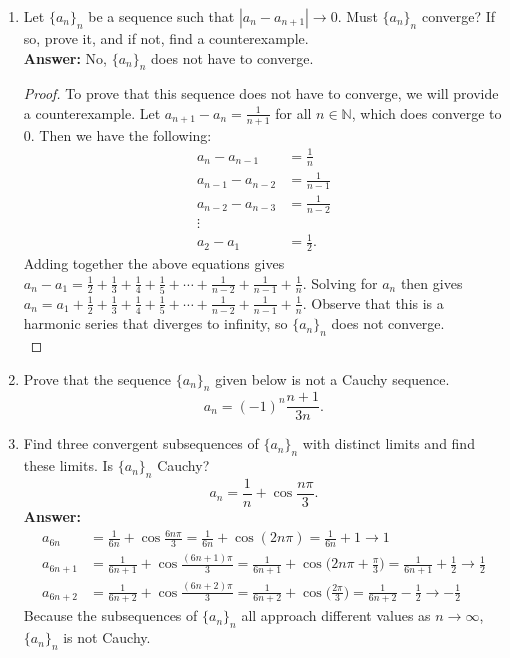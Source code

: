 \documentclass{article}
\begin{document}
\begin{enumerate}
        \item Let $\{a_n\}_n$ be a sequence such that $|a_n - a_{n+1}| \to 0$. Must $\{a_n\}_n$ converge? If so, prove it, and if not, find a counterexample.\\
        \textbf{Answer: }No, $\{a_n\}_n$ does not have to converge.
            \begin{proof}
                To prove that this sequence does not have to converge, we will provide a counterexample. Let $a_{n+1}-a_n = \frac{1}{n+1}$ for all $n \in \mathbb{N}$, which does converge to $0$. Then we have the following:
                    \begin{align*}
                        a_n-a_{n-1} &= \frac{1}{n}\\
                        a_{n-1}-a_{n-2} &= \frac{1}{n-1}\\
                        a_{n-2}-a_{n-3} &= \frac{1}{n-2}\\
                        \vdots\\
                        a_2-a_1 &= \frac{1}{2}. 
                    \end{align*}
                Adding together the above equations gives $a_n-a_1 = \frac{1}{2}+\frac{1}{3}+\frac{1}{4}+\frac{1}{5}+\cdots+\frac{1}{n-2}+\frac{1}{n-1}+\frac{1}{n}$. Solving for $a_n$ then gives $a_n = a_1+ \frac{1}{2}+\frac{1}{3}+\frac{1}{4}+\frac{1}{5}+\cdots+\frac{1}{n-2}+\frac{1}{n-1}+\frac{1}{n}$. Observe that this is a harmonic series that diverges to infinity, so $\{a_n\}_n$ does not converge.\\
            \end{proof}
        
        \item Prove that the sequence $\{a_n\}_n$ given below is not a Cauchy sequence.
        \[a_n = (-1)^n \frac{n+1}{3n}.\]
        
        \item Find three convergent subsequences of $\{a_n\}_n$ with distinct limits and find these limits. Is $\{a_n\}_n$ Cauchy?
        \[a_n = \frac{1}{n} + \cos{\frac{n\pi}{3}}.\]
        \textbf{Answer: }
            \begin{align*}
                a_{6n} &= \frac{1}{6n}+\cos{\frac{6n\pi}{3}} = \frac{1}{6n}+\cos{(2n\pi)} = \frac{1}{6n}+1 \to 1\\
                a_{6n+1} &= \frac{1}{6n+1}+\cos{\frac{(6n+1)\pi}{3}} = \frac{1}{6n+1}+\cos{\Big(2n\pi+\frac{\pi}{3}\Big)} = \frac{1}{6n+1}+ \frac{1}{2} \to \frac{1}{2}\\
                a_{6n+2} &= \frac{1}{6n+2}+\cos{\frac{(6n+2)\pi}{3}} = \frac{1}{6n+2}+\cos{\Big(\frac{2\pi}{3}\Big)} = \frac{1}{6n+2}-\frac{1}{2} \to -\frac{1}{2}
            \end{align*}
        Because the subsequences of $\{a_n\}_n$ all approach different values as $n \to \infty$, $\{a_n\}_n$ is not Cauchy.\\
        

\end{enumerate}
\end{document}
